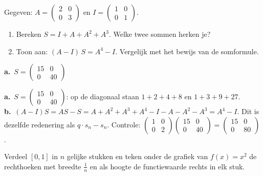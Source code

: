 \begin{oefeningen}
\begin{oefening}[2]
 Gegeven: $A = \begin{pmatrix} 2 & 0 \\ 0 & 3 \end{pmatrix}$ en $I = \begin{pmatrix} 1 & 0 \\ 0 & 1 \end{pmatrix}$.
\begin{enumerate}
  \item Bereken $S = I + A + A^2 + A^3$. Welke twee sommen herken je?
  \item Toon aan: $(A - I)\,S = A^4 - I$. Vergelijk met het bewijs van de somformule.
\end{enumerate}
\begin{solution}
\textbf{a.}~$S=\begin{pmatrix} 15 & 0 \\ 0 & 40 \end{pmatrix}$
\end{solution}
\begin{fullsolution}
\textbf{a.}~$S=\begin{pmatrix} 15 & 0 \\ 0 & 40 \end{pmatrix}$: op de diagonaal staan $1+2+4+8$ en $1+3+9+27$.\\
\textbf{b.}~$(A-I)S=AS-S=A+A^2+A^3+A^4-I-A-A^2-A^3=A^4-I$. Dit is dezelfde redenering als $q\cdot s_n-s_n$. Controle: $\begin{pmatrix} 1 & 0 \\ 0 & 2 \end{pmatrix}\begin{pmatrix} 15 & 0 \\ 0 & 40 \end{pmatrix}=\begin{pmatrix} 15 & 0 \\ 0 & 80 \end{pmatrix}$.
\end{fullsolution}
\end{oefening}

\begin{oefening}[3]
 Verdeel $[0, 1]$ in $n$ gelijke stukken en teken onder de grafiek van $f(x) = x^2$ de rechthoeken met breedte $\tfrac1n$ en als hoogte de functiewaarde rechts in elk stuk.


\end{oefening}
\end{oefeningen}
